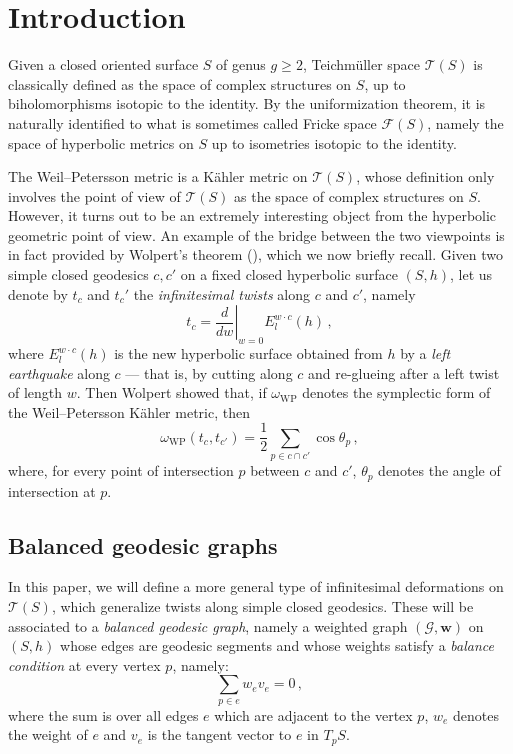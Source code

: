 \documentclass[11pt]{article}
\theoremstyle{definition}
\numberwithin{equation}{section}
\numberwithin{figure}{section}
\numberwithin{table}{section}
\newcommand{\Teich}{\mathcal{T}}
\newcommand{\weil}{{\mathrm{W}\!\mathrm{P}}}
\begin{document}
\section{Introduction}

Given a closed oriented surface $S$ of genus $g\geq 2$, Teichm\"uller space $\Teich(S)$ is classically defined as the space of complex structures on $S$, up to biholomorphisms isotopic to the identity. By the uniformization theorem, it is naturally identified to what is sometimes called Fricke space $\mathcal F(S)$, namely the space of hyperbolic metrics on $S$ up to isometries isotopic to the identity.

The Weil--Petersson metric is a K\"ahler metric on $\Teich(S)$, whose definition only involves the point of view of $\Teich(S)$ as the space of complex structures on $S$. However, it turns out to be an extremely interesting object from the hyperbolic geometric point of view. An example of the bridge between the two viewpoints is in fact provided by Wolpert's theorem (\cite{wolpertelementary,wolpertformula}), which we now briefly recall. Given two simple closed geodesics $c,c'$ on a fixed closed hyperbolic surface $(S,h)$, let us denote by $t_c$ and $t_c'$ the \emph{infinitesimal twists} along $c$ and $c'$, namely
\[
t_c=\left.\frac{d}{dw}\right|_{w=0}E_l^{w\cdot c}(h)\,,
\]
where $E_l^{w\cdot c}(h)$ is the new hyperbolic surface obtained from $h$ by a \emph{left earthquake} along $c$ --- that is, by cutting along $c$ and re-glueing after a left twist of length $w$. Then Wolpert showed that, if $\omega_\weil$ denotes the symplectic form of the Weil--Petersson K\"ahler metric, then
\begin{equation}\label{eq wolpert formula}
\omega_\weil(t_{c},t_{c'})=\frac{1}{2}\sum_{p\in c\cap c'}\cos \theta_p\,,
\end{equation}
where, for every point of intersection $p$ between $c$ and $c'$, $\theta_p$ denotes the angle of intersection at $p$.


\subsection{Balanced geodesic graphs}

In this paper, we will define a more general type of infinitesimal deformations on $\Teich(S)$, which generalize twists along simple closed geodesics. These will be associated to a \emph{balanced geodesic graph}, namely a weighted graph $(\mathcal G,\mathbf w)$ on $(S,h)$ whose edges are geodesic segments and whose weights satisfy a \emph{balance condition} at every vertex $p$, namely:
\begin{equation}\label{eq balance intro}
{\sum_{p\in e} w_{e} v_{e}}=0\,,
\end{equation}
where the sum is over all edges $e$ which are adjacent to the vertex $p$, $w_e$ denotes the weight of $e$ and $v_e$ is the tangent vector to $e$ in $T_p S$.
\end{document}
